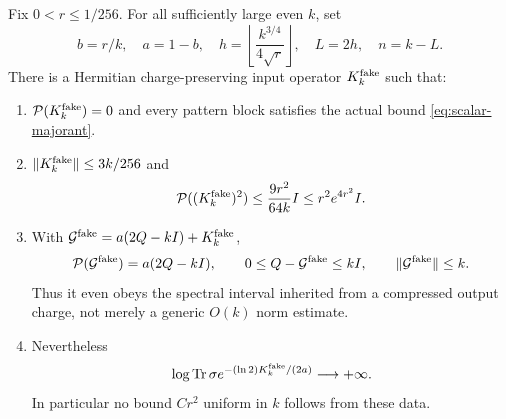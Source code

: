 \begin{theorem}
\label{thm:abstract-rare-sector}
Fix $0<r\le1/256$. For all sufficiently large even $k$, set
\[
 b=r/k,\quad a=1-b,\quad
 h=\left\lfloor\frac{k^{3/4}}{4\sqrt r}\right\rfloor,
 \quad L=2h,\quad n=k-L.
\]
There is a Hermitian charge-preserving input operator $K^{\rm fake}_k$
such that:
\begin{enumerate}
 \item $\mathcal P(K^{\rm fake}_k)=0$ and every pattern block satisfies
 the actual bound \eqref{eq:scalar-majorant}.
 \item $\|K^{\rm fake}_k\|\le3k/256$ and
 \[
  \mathcal P((K^{\rm fake}_k)^2)
       \le\frac{9r^2}{64k}I\le r^2e^{4r^2}I.
 \]
 \item With $\mathcal G^{\rm fake}=a(2Q-kI)+K^{\rm fake}_k$,
 \[
  \mathcal P(\mathcal G^{\rm fake})=a(2Q-kI),\qquad
  0\le Q-\mathcal G^{\rm fake}\le kI,\qquad
  \|\mathcal G^{\rm fake}\|\le k.
 \]
 Thus it even obeys the spectral interval inherited from a compressed
 output charge, not merely a generic $O(k)$ norm estimate.
 \item Nevertheless
 \[
  \log\operatorname{Tr}\sigma
    e^{-(\ln2)K^{\rm fake}_k/(2a)}\longrightarrow+\infty.
 \]
 In particular no bound $C r^2$ uniform in $k$ follows from these data.
\end{enumerate}
\end{theorem}
